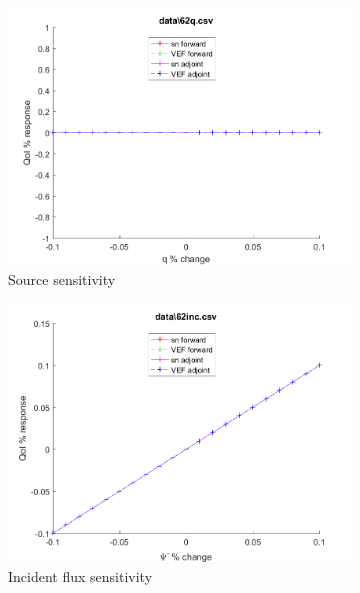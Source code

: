 \documentclass{article}
\begin{document}
\begin{figure}[H]
\label{Case62Sens}
\centering
\begin{subfigure}{.5\textwidth}
  \centering
  \includegraphics[width=.98\linewidth]{IanProposal/figures2/62qSens.png}
  \caption{Source sensitivity}
  \label{fig:sfig1}
\end{subfigure}%
\begin{subfigure}{.5\textwidth}
  \centering
  \includegraphics[width=.98\linewidth]{IanProposal/figures2/62incSens.png}
  \caption{Incident flux sensitivity}
  \label{fig:sfig4}
\end{subfigure}%
\\
\begin{subfigure}{.5\textwidth}
  \centering

\end{subfigure}
\end{figure}
\end{document}
